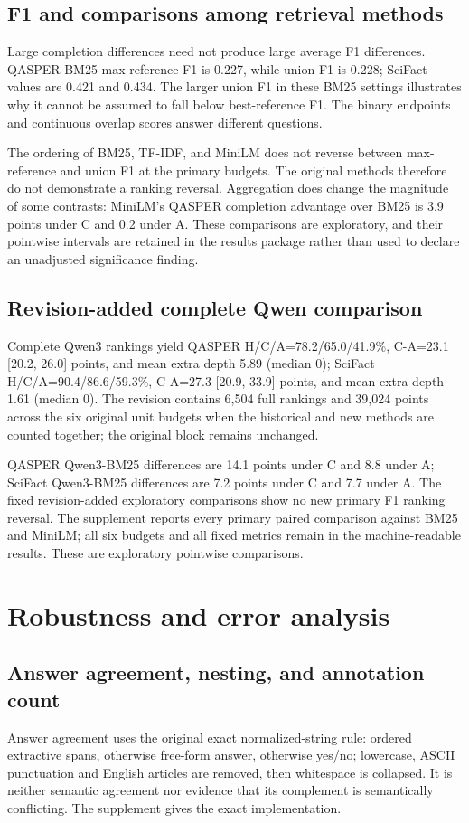 \documentclass[twoside,a4paper,11pt]{article}
\begin{document}
\subsection{F1 and comparisons among retrieval methods}
Large completion differences need not produce large average F1 differences. QASPER BM25 max-reference F1 is 0.227, while union F1 is 0.228; SciFact values are 0.421 and 0.434. The larger union F1 in these BM25 settings illustrates why it cannot be assumed to fall below best-reference F1. The binary endpoints and continuous overlap scores answer different questions.

The ordering of BM25, TF-IDF, and MiniLM does not reverse between max-reference and union F1 at the primary budgets. The original methods therefore do not demonstrate a ranking reversal. Aggregation does change the magnitude of some contrasts: MiniLM's QASPER completion advantage over BM25 is 3.9 points under C and 0.2 under A. These comparisons are exploratory, and their pointwise intervals are retained in the results package rather than used to declare an unadjusted significance finding.


\subsection{Revision-added complete Qwen comparison}
Complete Qwen3 rankings yield QASPER H/C/A=78.2/65.0/41.9\%, C-A=23.1 [20.2, 26.0] points, and mean extra depth 5.89 (median 0); SciFact H/C/A=90.4/86.6/59.3\%, C-A=27.3 [20.9, 33.9] points, and mean extra depth 1.61 (median 0). The revision contains 6,504 full rankings and 39,024 points across the six original unit budgets when the historical and new methods are counted together; the original block remains unchanged.

QASPER Qwen3-BM25 differences are 14.1 points under C and 8.8 under A; SciFact Qwen3-BM25 differences are 7.2 points under C and 7.7 under A. The fixed revision-added exploratory comparisons show no new primary F1 ranking reversal. The supplement reports every primary paired comparison against BM25 and MiniLM; all six budgets and all fixed metrics remain in the machine-readable results. These are exploratory pointwise comparisons.


\section{Robustness and error analysis}

\subsection{Answer agreement, nesting, and annotation count}
Answer agreement uses the original exact normalized-string rule: ordered extractive spans, otherwise free-form answer, otherwise yes/no; lowercase, ASCII punctuation and English articles are removed, then whitespace is collapsed. It is neither semantic agreement nor evidence that its complement is semantically conflicting. The supplement gives the exact implementation.
\end{document}

